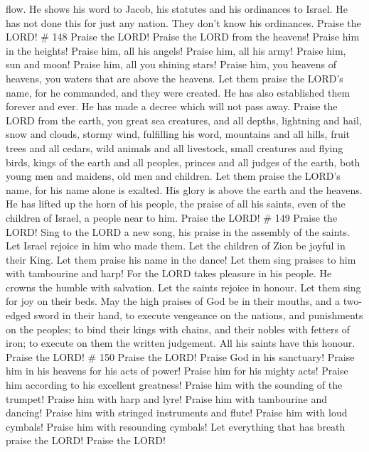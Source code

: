 flow.  He shows his word to Jacob, his statutes and his
ordinances to Israel.  He has not done this for just any
nation. They don't know his ordinances. Praise the LORD! \# 148
 Praise the LORD! Praise the LORD from the heavens! Praise
him in the heights!  Praise him, all his angels! Praise him,
all his army!  Praise him, sun and moon! Praise him, all you
shining stars!  Praise him, you heavens of heavens, you
waters that are above the heavens.  Let them praise the
LORD's name, for he commanded, and they were created.  He
has also established them forever and ever. He has made a decree which
will not pass away.  Praise the LORD from the earth, you
great sea creatures, and all depths,  lightning and hail,
snow and clouds, stormy wind, fulfilling his word, 
mountains and all hills, fruit trees and all cedars,  wild
animals and all livestock, small creatures and flying birds,
 kings of the earth and all peoples, princes and all judges
of the earth,  both young men and maidens, old men and
children.  Let them praise the LORD's name, for his name
alone is exalted. His glory is above the earth and the heavens.
 He has lifted up the horn of his people, the praise of all
his saints, even of the children of Israel, a people near to him. Praise
the LORD! \# 149  Praise the LORD! Sing to the LORD a new
song, his praise in the assembly of the saints.  Let Israel
rejoice in him who made them. Let the children of Zion be joyful in
their King.  Let them praise his name in the dance! Let them
sing praises to him with tambourine and harp!  For the LORD
takes pleasure in his people. He crowns the humble with salvation.
 Let the saints rejoice in honour. Let them sing for joy on
their beds.  May the high praises of God be in their mouths,
and a two-edged sword in their hand,  to execute vengeance
on the nations, and punishments on the peoples;  to bind
their kings with chains, and their nobles with fetters of iron;
 to execute on them the written judgement. All his saints
have this honour. Praise the LORD! \# 150  Praise the LORD!
Praise God in his sanctuary! Praise him in his heavens for his acts of
power!  Praise him for his mighty acts! Praise him according
to his excellent greatness!  Praise him with the sounding of
the trumpet! Praise him with harp and lyre!  Praise him with
tambourine and dancing! Praise him with stringed instruments and flute!
 Praise him with loud cymbals! Praise him with resounding
cymbals!  Let everything that has breath praise the LORD!
Praise the LORD!
